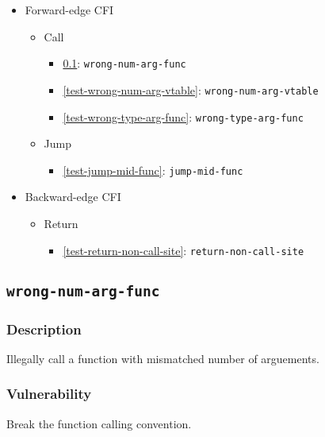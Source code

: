 \documentclass[a4paper]{book}
\begin{document}
\begin{itemize}[noitemsep]
\item Forward-edge CFI
  \begin{itemize}[noitemsep, nolistsep, leftmargin=1em]
  \item Call
    \begin{itemize}[noitemsep, nolistsep, leftmargin=1em]
      \item \ref{test-wrong-num-arg-func}: \texttt{wrong-num-arg-func}
      \item \ref{test-wrong-num-arg-vtable}: \texttt{wrong-num-arg-vtable}
      \item \ref{test-wrong-type-arg-func}: \texttt{wrong-type-arg-func}
    \end{itemize}
  \item Jump
    \begin{itemize}[noitemsep, nolistsep, leftmargin=1em]
      \item \ref{test-jump-mid-func}: \texttt{jump-mid-func}
    \end{itemize}
  \end{itemize}
\item Backward-edge CFI
  \begin{itemize}[noitemsep, nolistsep, leftmargin=1em]
  \item Return
    \begin{itemize}[noitemsep, nolistsep, leftmargin=1em]
      \item \ref{test-return-non-call-site}: \texttt{return-non-call-site} 
    \end{itemize}
  \end{itemize}
\end{itemize}

\newpage
\subsection{\texttt{wrong-num-arg-func}}\label{test-wrong-num-arg-func}

\subsubsection{Description}
Illegally call a function with mismatched number of arguements.

\subsubsection{Vulnerability}
Break the function calling convention.
\end{document}
